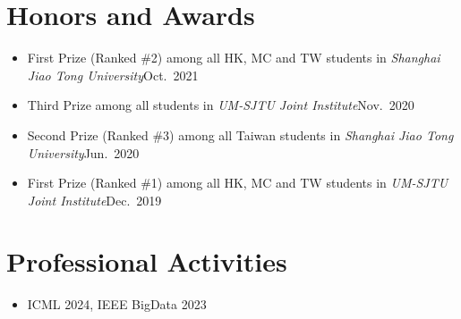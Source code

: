 \documentclass[letterpaper,10.8pt]{article}
\begin{document}
\section{Honors and Awards}
\begin{itemize}
      \item {}
            {First Prize (Ranked \#2) among all HK, MC and TW students in \emph{Shanghai Jiao Tong University}}{Oct.\ 2021}

      \item {}
            {Third Prize among all students in \emph{UM-SJTU Joint Institute}}{Nov.\ 2020}

      \item {}
            {Second Prize (Ranked \#3) among all Taiwan students in \emph{Shanghai Jiao Tong University}}{Jun.\ 2020}

      \item {}
            {First Prize (Ranked \#1) among all HK, MC and TW students in \emph{UM-SJTU Joint Institute}}{Dec.\ 2019}
\end{itemize}

\section{Professional Activities}
\begin{itemize}
      \item {}
            {ICML 2024, IEEE BigData 2023}{}
\end{itemize}
\end{document}
